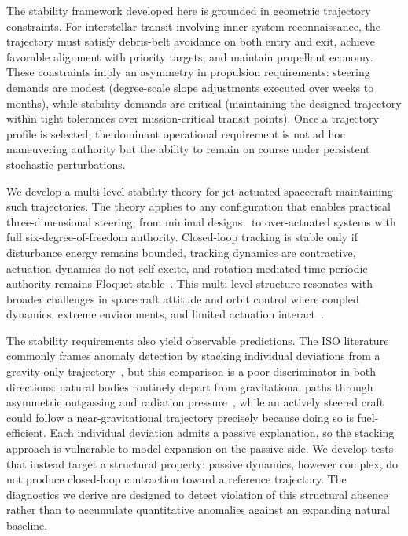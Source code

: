 \documentclass{article}
\begin{document}
The stability framework developed here is grounded in geometric trajectory constraints. For interstellar transit involving inner-system reconnaissance, the trajectory must satisfy debris-belt avoidance on both entry and exit, achieve favorable alignment with priority targets, and maintain propellant economy. These constraints imply an asymmetry in propulsion requirements: steering demands are modest (degree-scale slope adjustments executed over weeks to months), while stability demands are critical (maintaining the designed trajectory within tight tolerances over mission-critical transit points). Once a trajectory profile is selected, the dominant operational requirement is not ad hoc maneuvering authority but the ability to remain on course under persistent stochastic perturbations.

We develop a multi-level stability theory for jet-actuated spacecraft maintaining such trajectories. The theory applies to any configuration that enables practical three-dimensional steering, from minimal designs~\cite{andree2026thruster} to over-actuated systems with full six-degree-of-freedom authority. Closed-loop tracking is stable only if disturbance energy remains bounded, tracking dynamics are contractive, actuation dynamics do not self-excite, and rotation-mediated time-periodic authority remains Floquet-stable~\cite{bittanti2009periodic}. This multi-level structure resonates with broader challenges in spacecraft attitude and orbit control where coupled dynamics, extreme environments, and limited actuation interact~\cite{zhang2024advances_sdc,li2024trajectory_mars}.

The stability requirements also yield observable predictions. The ISO literature commonly frames anomaly detection by stacking individual deviations from a gravity-only trajectory~\cite{eldadi2026ioss}, but this comparison is a poor discriminator in both directions: natural bodies routinely depart from gravitational paths through asymmetric outgassing and radiation pressure~\cite{micheli2018oumuamua,bockelee2004borrelly,jockers2011encke}, while an actively steered craft could follow a near-gravitational trajectory precisely because doing so is fuel-efficient. Each individual deviation admits a passive explanation, so the stacking approach is vulnerable to model expansion on the passive side. We develop tests that instead target a structural property: passive dynamics, however complex, do not produce closed-loop contraction toward a reference trajectory. The diagnostics we derive are designed to detect violation of this structural absence rather than to accumulate quantitative anomalies against an expanding natural baseline.
\end{document}
